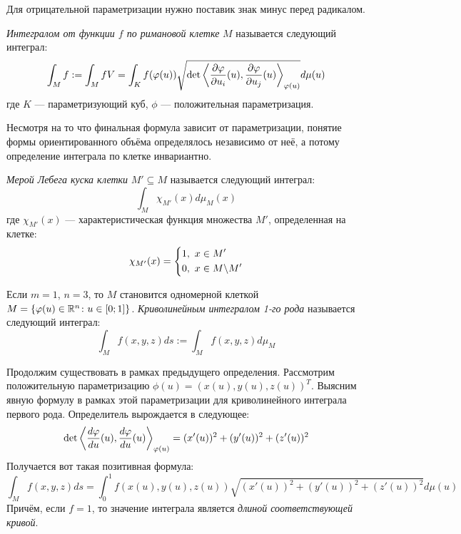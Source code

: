 \begin{note}
	Для отрицательной параметризации нужно поставик знак минус перед радикалом.
\end{note}

\begin{definition}
	\textit{Интегралом от функции $f$ по римановой клетке} $M$ называется следующий интеграл:
	\[
		\int_M f := \int_M fV = \int_K f(\varphi(u))\sqrt{\det\left\langle\frac{\partial \varphi}{\partial u_i}(u), \frac{\partial \varphi}{\partial u_j}(u)\right\rangle_{\varphi(u)}}d\mu(u)
	\]
	где $K$ --- параметризующий куб, $\phi$ --- положительная параметризация.
\end{definition}

\begin{note}
	Несмотря на то что финальная формула зависит от параметризации, понятие формы ориентированного объёма определялось независимо от неё, а потому определение интеграла по клетке инвариантно.
\end{note}

\begin{definition}
	\textit{Мерой Лебега куска клетки} $M' \subseteq M$ называется следующий интеграл:
	\[
		\int_M \chi_{M'}(x)d\mu_M(x)
	\]
	где $\chi_{M'}(x)$ --- характеристическая функция множества $M'$, определенная на клетке:
	\[
		\chi_{M'}(x) = \left\{ \begin{aligned} 
			&{1,\ x \in M'}
			\\
			&{0,\ x \in M \backslash M'}
		 \end{aligned} \right.
	\]
\end{definition}

\begin{definition}
	Если $m = 1$, $n = 3$, то $M$ становится одномерной клеткой $M = \{\varphi(u) \in \mathbb{R}^n \colon u \in [0; 1]\}$. \textit{Криволинейным интегралом 1-го рода} называется следующий интеграл:
	\[
		\int_M f(x, y, z)ds := \int_M f(x, y, z)d\mu_M
	\]
\end{definition}

\begin{note}
	Продолжим существовать в рамках предыдущего определения. Рассмотрим положительную параметризацию $\phi(u) = (x(u), y(u), z(u))^T$. Выясним явную формулу в рамках этой параметризации для криволинейного интеграла первого рода. Определитель вырождается в следующее:
	\[
		\det\left\langle\frac{d\varphi}{du}(u), \frac{d\varphi}{du}(u)\right\rangle_{\varphi(u)} = (x'(u))^2 + (y'(u))^2 + (z'(u))^2
	\]
	Получается вот такая позитивная формула:
	\[
		\int_M f(x, y, z)ds = \int_0^1 f(x(u), y(u), z(u))\sqrt{(x'(u))^2 + (y'(u))^2 + (z'(u))^2}d\mu(u)
	\]
	Причём, если $f = 1$, то значение интеграла является \textit{длиной соответствующей кривой}.
\end{note}

